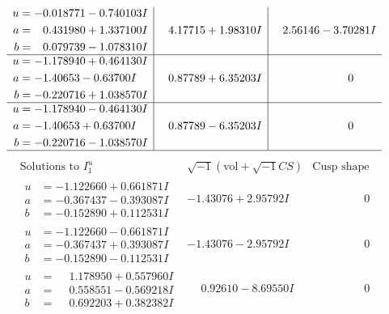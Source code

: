 \documentclass[1p]{elsarticle_modified}
\theoremstyle{definition}
\newcommand{\I}{\sqrt{-1}}
\begin{document}
$$\begin{array}{c|c|c}
\begin{aligned}
u &= -0.018771 - 0.740103 I \\
a &= \phantom{-}0.431980 + 1.337100 I \\
b &= \phantom{-}0.079739 - 1.078310 I\end{aligned}
 & \phantom{-}4.17715 + 1.98310 I & \phantom{-}2.56146 - 3.70281 I \\ \hline\begin{aligned}
u &= -1.178940 + 0.464130 I \\
a &= -1.40653 - 0.63700 I \\
b &= -0.220716 + 1.038570 I\end{aligned}
 & \phantom{-}0.87789 + 6.35203 I & \phantom{-0.000000 } 0 \\ \hline\begin{aligned}
u &= -1.178940 - 0.464130 I \\
a &= -1.40653 + 0.63700 I \\
b &= -0.220716 - 1.038570 I\end{aligned}
 & \phantom{-}0.87789 - 6.35203 I & \phantom{-0.000000 } 0\\
 \hline 
 \end{array}$$\newpage$$\begin{array}{c|c|c}  
\text{Solutions to }I^u_{1}& \I (\text{vol} + \sqrt{-1}CS) & \text{Cusp shape}\\
 \hline 
\begin{aligned}
u &= -1.122660 + 0.661871 I \\
a &= -0.367437 - 0.393087 I \\
b &= -0.152890 + 0.112531 I\end{aligned}
 & -1.43076 + 2.95792 I & \phantom{-0.000000 } 0 \\ \hline\begin{aligned}
u &= -1.122660 - 0.661871 I \\
a &= -0.367437 + 0.393087 I \\
b &= -0.152890 - 0.112531 I\end{aligned}
 & -1.43076 - 2.95792 I & \phantom{-0.000000 } 0 \\ \hline\begin{aligned}
u &= \phantom{-}1.178950 + 0.557960 I \\
a &= \phantom{-}0.558551 - 0.569218 I \\
b &= \phantom{-}0.692203 + 0.382382 I\end{aligned}
 & \phantom{-}0.92610 - 8.69550 I & \phantom{-0.000000 } 0 \\ \hline\begin{aligned}

\end{aligned}
\end{array}$$
\end{document}

